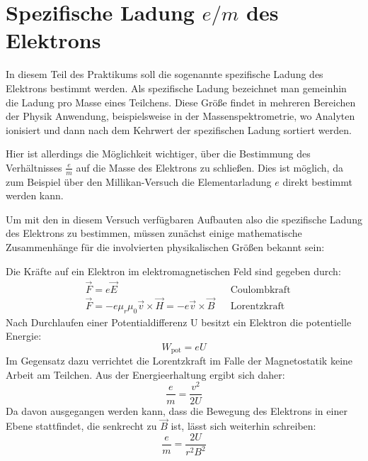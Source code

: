 \chapter{Spezifische Ladung $e/m$ des Elektrons}
In diesem Teil des Praktikums soll die sogenannte spezifische Ladung des Elektrons bestimmt werden. Als spezifische Ladung bezeichnet man gemeinhin die Ladung pro Masse eines Teilchens. Diese Größe findet in mehreren Bereichen der Physik Anwendung, beispielsweise in der Massenspektrometrie, wo Analyten ionisiert und dann nach dem Kehrwert der spezifischen Ladung sortiert werden.

Hier ist allerdings die Möglichkeit wichtiger, über die Bestimmung des Verhältnisses $\frac{e}{m}$ auf die Masse des Elektrons zu schließen. Dies ist möglich, da zum Beispiel über den Millikan-Versuch die Elementarladung $e$ direkt bestimmt werden kann. 

Um mit den in diesem Versuch verfügbaren Aufbauten also die spezifische Ladung des Elektrons zu bestimmen, müssen zunächst einige mathematische Zusammenhänge für die involvierten physikalischen Größen bekannt sein:

Die Kräfte auf ein Elektron im elektromagnetischen Feld sind gegeben durch:
\begin{align}
	&\vec{F}=e\vec{E}&&\mathrm{Coulombkraft}\\
	&\vec{F}=-e\mu_r\mu_0\vec{v}\times\vec{H}=-e\vec{v}\times\vec{B}&&\mathrm{Lorentzkraft}
\end{align}
Nach Durchlaufen einer Potentialdifferenz U besitzt ein Elektron die potentielle Energie:
\begin{equation}
	W_{\mathrm{pot}}=eU
\end{equation}
Im Gegensatz dazu verrichtet die Lorentzkraft im Falle der Magnetostatik keine Arbeit am Teilchen. Aus der Energieerhaltung ergibt sich daher:
\begin{equation}
\label{eq:2} \frac{e}{m}=\frac{v^2}{2U}
\end{equation}
Da davon ausgegangen werden kann, dass die Bewegung des Elektrons in einer Ebene stattfindet, die senkrecht zu $\vec{B}$ ist, lässt sich weiterhin schreiben:
\begin{equation}
\label{eq:1} \frac{e}{m}=\frac{2U}{r^2B^2}
\end{equation}
